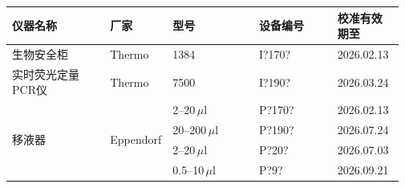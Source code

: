 \documentclass[UTF8,10pt,a4paper,fontset=fandol]{ctexart}
\newcommand{\fieldvalue}[1]{#1}
\newcommand{\handwritten}[1]{#1}
\begin{document}
\begin{tabular}{|p{0.25\linewidth}|p{0.13\linewidth}|p{0.22\linewidth}|p{0.20\linewidth}|p{0.17\linewidth}|}
\hline
仪器名称 & 厂家 & 型号 & 设备编号 & 校准有效期至 \\
\hline
生物安全柜 & Thermo & 1384 &
\fieldvalue{\handwritten{I?170?}} &
\fieldvalue{\handwritten{2026.02.13}} \\
\hline
实时荧光定量PCR仪 & Thermo & 7500 &
\fieldvalue{\handwritten{I?190?}} &
\fieldvalue{\handwritten{2026.03.24}} \\
\hline
\multirow{4}{*}{移液器} & \multirow{4}{*}{Eppendorf} &
\fieldvalue{\handwritten{2--20\,$\mu$l}} &
\fieldvalue{\handwritten{P?170?}} &
\fieldvalue{\handwritten{2026.02.13}} \\
\cline{3-5}
& &
\fieldvalue{\handwritten{20--200\,$\mu$l}} &
\fieldvalue{\handwritten{P?190?}} &
\fieldvalue{\handwritten{2026.07.24}} \\
\cline{3-5}
& &
\fieldvalue{\handwritten{2--20\,$\mu$l}} &
\fieldvalue{\handwritten{P?20?}} &
\fieldvalue{\handwritten{2026.07.03}} \\
\cline{3-5}
& &
\fieldvalue{\handwritten{0.5--10\,$\mu$l}} &
\fieldvalue{\handwritten{P?9?}} &
\fieldvalue{\handwritten{2026.09.21}} \\
\hline
\end{tabular}
\end{document}
